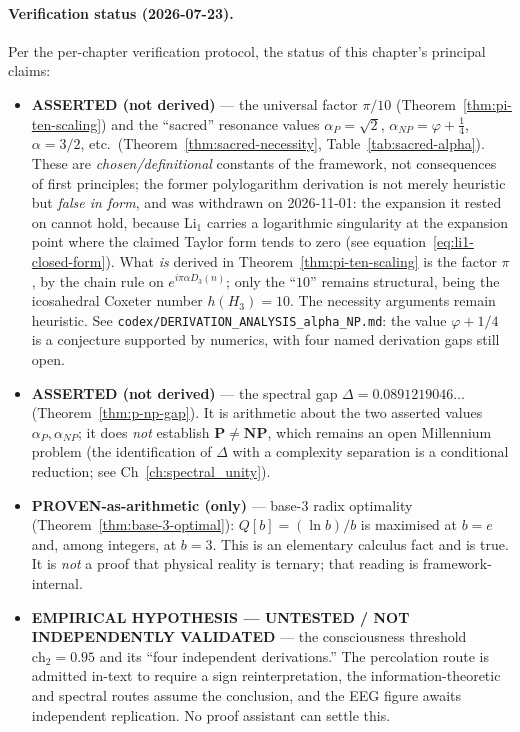 \paragraph{Verification status (2026-07-23).}
Per the per-chapter verification protocol, the status of this chapter's principal claims:
\begin{itemize}
\item \textbf{ASSERTED (not derived)} --- the universal factor $\pi/10$ (Theorem~\ref{thm:pi-ten-scaling}) and the ``sacred'' resonance values $\alpha_P=\sqrt{2}$, $\alpha_{NP}=\varphi+\tfrac14$, $\alpha=3/2$, etc.\ (Theorem~\ref{thm:sacred-necessity}, Table~\ref{tab:sacred-alpha}). These are \emph{chosen/definitional} constants of the framework, not consequences of first principles; the former polylogarithm derivation is not merely heuristic but \emph{false in
form}, and was withdrawn on 2026-11-01: the expansion it rested on cannot hold,
because $\text{Li}_1$ carries a logarithmic singularity at the expansion point
where the claimed Taylor form tends to zero (see
equation~\eqref{eq:li1-closed-form}). What \emph{is} derived in
Theorem~\ref{thm:pi-ten-scaling} is the factor $\pi$, by the chain rule on
$e^{i\pi\alpha D_3(n)}$; only the ``$10$'' remains structural, being the
icosahedral Coxeter number $h(H_3) = 10$. The necessity arguments remain
heuristic. See \texttt{codex/DERIVATION\_ANALYSIS\_alpha\_NP.md}: the value $\varphi+1/4$ is a conjecture supported by numerics, with four named derivation gaps still open.
\item \textbf{ASSERTED (not derived)} --- the spectral gap $\Delta = 0.0891219046\ldots$ (Theorem~\ref{thm:p-np-gap}). It is arithmetic about the two asserted values $\alpha_P,\alpha_{NP}$; it does \emph{not} establish $\mathbf{P}\neq\mathbf{NP}$, which remains an open Millennium problem (the identification of $\Delta$ with a complexity separation is a conditional reduction; see Ch~\ref{ch:spectral_unity}).
\item \textbf{PROVEN-as-arithmetic (only)} --- base-3 radix optimality (Theorem~\ref{thm:base-3-optimal}): $Q[b]=(\ln b)/b$ is maximised at $b=e$ and, among integers, at $b=3$. This is an elementary calculus fact and is true. It is \emph{not} a proof that physical reality is ternary; that reading is framework-internal.
\item \textbf{EMPIRICAL HYPOTHESIS --- UNTESTED / NOT INDEPENDENTLY VALIDATED} --- the consciousness threshold $\text{ch}_2=0.95$ and its ``four independent derivations.'' The percolation route is admitted in-text to require a sign reinterpretation, the information-theoretic and spectral routes assume the conclusion, and the EEG figure awaits independent replication. No proof assistant can settle this.

\end{itemize}
